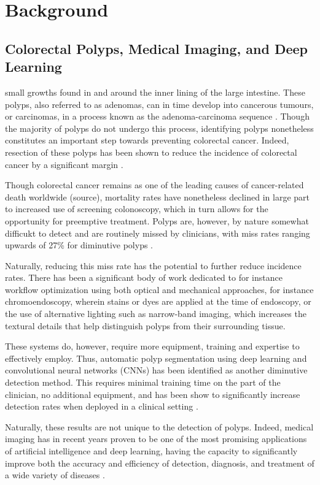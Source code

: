 \chapter{Background}
\setcounter{chapter}{2}
\section{Colorectal Polyps, Medical Imaging, and Deep Learning}
 small growths found in and around the inner lining of the large intestine. These polyps, also referred to as adenomas, can in time develop into cancerous tumours, or carcinomas, in a process known as the adenoma-carcinoma sequence \cite{ACS}. Though the majority of polyps do not undergo this process, identifying polyps nonetheless constitutes an important step towards preventing colorectal cancer. Indeed, resection of these polyps has been shown to reduce the incidence of colorectal cancer by a significant margin \cite{resection}. 
	
	Though colorectal cancer remains as one of the leading causes of cancer-related death worldwide (source), mortality rates have nonetheless declined in large part to increased use of screening colonoscopy, which in turn allows for the opportunity for preemptive treatment. Polyps are, however, by nature somewhat difficukt to detect and are routinely missed by clinicians, with miss rates ranging upwards of 27\% for diminutive  polyps \cite{missrate1, missrate2}.
	
	Naturally, reducing this miss rate has the potential to further reduce incidence rates. There has been a significant body of work dedicated to for instance workflow optimization using both optical and mechanical approaches, for instance chromoendoscopy, wherein stains or dyes are applied at the time of endoscopy, or the use of alternative lighting such as narrow-band imaging, which increases the textural details that help distinguish polyps from their surrounding tissue. 
	
	These systems do, however, require more equipment, training and expertise to effectively employ. Thus, automatic polyp segmentation using deep learning and convolutional neural networks (CNNs) has been identified as another diminutive detection method. This requires minimal training time on the part of the clinician, no additional equipment, and has been show to significantly increase detection rates when deployed in a clinical setting \cite{polyp-success-story}. 
	
	Naturally, these results are not unique to the detection of polyps. Indeed, medical imaging has in recent years proven to be one of the most promising applications of artificial intelligence and deep learning, having the capacity to significantly improve both the accuracy and efficiency of detection, diagnosis, and treatment of a wide variety of diseases \cite{dl_medical_imaging}. 
	
